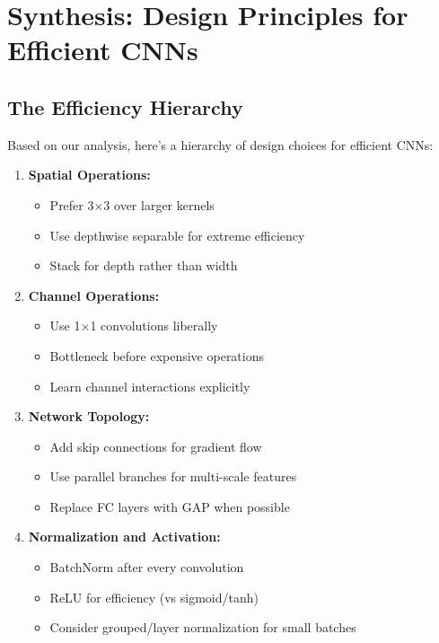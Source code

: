 \documentclass{article}
\begin{document}
\section{Synthesis: Design Principles for Efficient CNNs}

\subsection{The Efficiency Hierarchy}

Based on our analysis, here's a hierarchy of design choices for efficient CNNs:

\begin{enumerate}
    \item \textbf{Spatial Operations:}
    \begin{itemize}
        \item Prefer 3×3 over larger kernels
        \item Use depthwise separable for extreme efficiency
        \item Stack for depth rather than width
    \end{itemize}
    
    \item \textbf{Channel Operations:}
    \begin{itemize}
        \item Use 1×1 convolutions liberally
        \item Bottleneck before expensive operations
        \item Learn channel interactions explicitly
    \end{itemize}
    
    \item \textbf{Network Topology:}
    \begin{itemize}
        \item Add skip connections for gradient flow
        \item Use parallel branches for multi-scale features
        \item Replace FC layers with GAP when possible
    \end{itemize}
    
    \item \textbf{Normalization and Activation:}
    \begin{itemize}
        \item BatchNorm after every convolution
        \item ReLU for efficiency (vs sigmoid/tanh)
        \item Consider grouped/layer normalization for small batches
    \end{itemize}
\end{enumerate}
\end{document}
